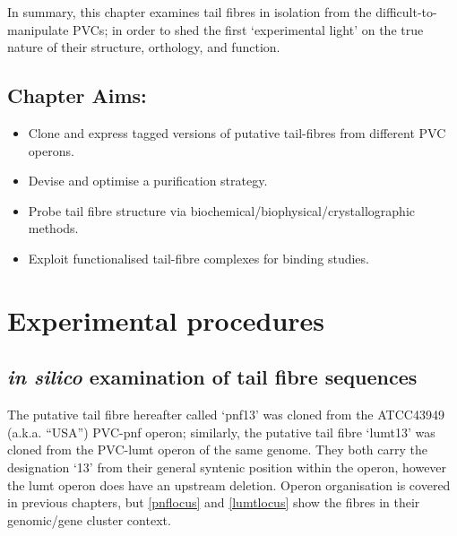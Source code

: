 In summary, this chapter examines tail fibres in isolation from the difficult-to-manipulate PVCs; in order to shed the first `experimental light' on the true nature of their structure, orthology, and function.

\subsection*{Chapter Aims:}
\begin{itemize}
	\item Clone and express tagged versions of putative tail-fibres from different PVC operons.
	\item Devise and optimise a purification strategy.
	\item Probe tail fibre structure via biochemical/biophysical/crystallographic methods.
	\item Exploit functionalised tail-fibre complexes for binding studies.
\end{itemize}
\clearpage

\section{Experimental procedures}

\subsection{\emph{in silico} examination of tail fibre sequences}
The putative tail fibre hereafter called `pnf13' was cloned from the \Pasy{} ATCC43949 (a.k.a. ``USA'') PVC-pnf operon; similarly, the putative tail fibre `lumt13' was cloned from the PVC-lumt operon of the same genome. They both carry the designation `13' from their general syntenic position within the operon, however the lumt operon does have an upstream deletion. Operon organisation is covered in previous chapters, but \vref{pnflocus} and \vref{lumtlocus} show the fibres in their genomic/gene cluster context.

